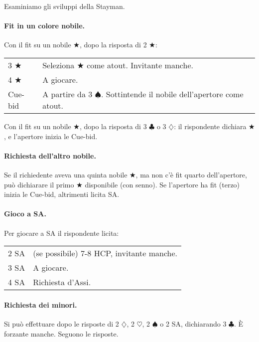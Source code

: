 \documentclass[a4paper,10pt]{article}
\renewcommand{\c}{$\clubsuit$\xspace}
\renewcommand{\d}{$\diamondsuit$\xspace}
\newcommand{\h}{$\heartsuit$\xspace}
\newcommand{\s}{$\spadesuit$\xspace}
\renewcommand{\j}{$\bigstar$\xspace}
\newcommand{\sa}{SA\xspace}
\newcommand{\smallspace}{\vskip0.3cm}
\newenvironment{twocol}
  {\smallspace\noindent\begin{tabular}{l p{0.8\textwidth}}}
  {\end{tabular}\smallspace}
\begin{document}
\noindent Esaminiamo gli sviluppi della Stayman.

\paragraph{Fit in un colore nobile.}

Con il fit su un nobile \j, dopo la risposta di 2 \j:
\begin{twocol}
 3 \j & Seleziona \j come atout. Invitante manche.\\
 4 \j & A giocare.\\
 Cue-bid & A partire da 3 \s. Sottintende il nobile dell'apertore come atout.\\
\end{twocol}

\noindent Con il fit su un nobile \j, dopo la risposta di 3 \c o 3 \d: il rispondente dichiara \j, e l'apertore inizia le Cue-bid.


\paragraph{Richiesta dell'altro nobile.}
Se il richiedente aveva una quinta nobile \j, ma non c'\`e fit quarto dell'apertore, può dichiarare il primo \j disponibile (con senno). Se l'apertore ha fit (terzo) inizia le Cue-bid, altrimenti licita \sa.

\paragraph{Gioco a SA.}
Per giocare a SA il rispondente licita:
\begin{twocol}
 2 \sa & (se possibile) 7-8 HCP, invitante manche.\\
 3 \sa & A giocare.\\
 4 \sa & Richiesta d'Assi.
\end{twocol}

\paragraph{Richiesta dei minori.} Si può effettuare dopo le risposte di 2 \d, 2 \h, 2 \s o 2 \sa, dichiarando 3 \c. È forzante manche. Seguono le risposte.
\end{document}
